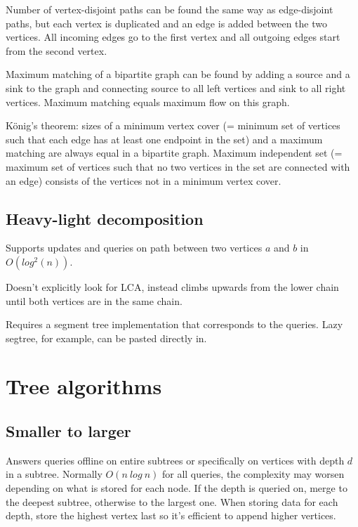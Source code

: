 \documentclass{article}
\begin{document}
Number of vertex-disjoint paths can be found the same way as edge-disjoint paths, but each vertex is duplicated and an edge is added between the two vertices. All incoming edges go to the first vertex and all outgoing edges start from the second vertex.

Maximum matching of a bipartite graph can be found by adding a source and a sink to the graph and connecting source to all left vertices and sink to all right vertices. Maximum matching equals maximum flow on this graph.

König's theorem: sizes of a minimum vertex cover (= minimum set of vertices such that each edge has at least one endpoint in the set) and a maximum matching are always equal in a bipartite graph. Maximum independent set (= maximum set of vertices such that no two vertices in the set are connected with an edge) consists of the vertices not in a minimum vertex cover.

\subsection {Heavy-light decomposition}

Supports updates and queries on path between two vertices $a$ and $b$ in $O(log^2(n))$.

Doesn't explicitly look for LCA, instead climbs upwards from the lower chain until both vertices are in the same chain.

Requires a segment tree implementation that corresponds to the queries. Lazy segtree, for example, can be pasted directly in.



\section {Tree algorithms}

\subsection {Smaller to larger}

Answers queries offline on entire subtrees or specifically on vertices with depth $d$ in a subtree. Normally $O(n\ log\ n)$ for all queries, the complexity may worsen depending on what is stored for each node. If the depth is queried on, merge to the deepest subtree, otherwise to the largest one. When storing data for each depth, store the highest vertex last so it's efficient to append higher vertices.
\end{document}

